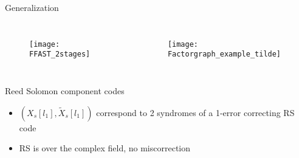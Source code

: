 	\begin{frame}{Generalization}
		
		
	\begin{columns}
			\begin{figure}[t]
				\centering
				\texttt{[image: FFAST\_2stages]}
			\end{figure}
			\vspace{-6mm}
			\hspace{-1.5in}
			
			\begin{figure}[t]
				
				\texttt{[image: Factorgraph\_example\_tilde]}
			\end{figure}
			
		\end{columns}
%				
		\begin{block}{Reed Solomon component codes}
			\begin{itemize}
				\item $(X_s[l_1],\tilde{X}_s[l_1])$ correspond to 2 syndromes of a 1-error correcting RS code
                \item RS is over the complex field, no miscorrection
			\end{itemize}
		\end{block}
	\end{frame}	
